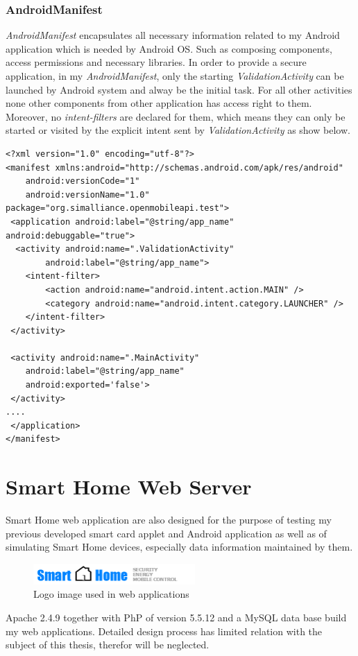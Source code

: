 \subsubsection{AndroidManifest}
\emph{AndroidManifest} encapsulates all necessary information related to my Android application which is needed by Android OS. Such as composing components, access permissions and necessary libraries\cite{android_manifest}. In order to provide a secure application, in my \emph{AndroidManifest}, only the starting \emph{ValidationActivity} can be launched by Android system and alway be the initial task. For all other activities none other components from other application has access right to them. Moreover, no \emph{intent-filters} are declared for them, which means they can only be started or visited by the explicit intent sent by \emph{ValidationActivity} as show below.
\begin{Verbatim}[fontsize=\relsize{-1},frame=lines,framesep=4mm, label=\fbox{\small\emph{AndroidManifest.xml}}]
<?xml version="1.0" encoding="utf-8"?>
<manifest xmlns:android="http://schemas.android.com/apk/res/android"
	android:versionCode="1"
	android:versionName="1.0" package="org.simalliance.openmobileapi.test">
 <application android:label="@string/app_name" android:debuggable="true">
  <activity android:name=".ValidationActivity"
 		android:label="@string/app_name">
	<intent-filter>
		<action android:name="android.intent.action.MAIN" />
		<category android:name="android.intent.category.LAUNCHER" />
	</intent-filter>
 </activity>
      
 <activity android:name=".MainActivity"
	android:label="@string/app_name"
	android:exported='false'>
 </activity>
....
 </application>
</manifest> 
\end{Verbatim}
\section{Smart Home Web Server}
Smart Home web application are also designed for the purpose of testing my previous developed smart card applet and Android application as well as of simulating Smart Home devices, especially data information maintained by them. 

\begin{figure}[!htbp]
	\centering
	\includegraphics[width=0.55\textwidth]{logo.png}
		\caption{Logo image used in web applications}
	\label{fig:logo}
\end{figure}

Apache 2.4.9 together with PhP of version 5.5.12 and a MySQL data base build my web applications.  Detailed design process has limited relation with the subject of this thesis, therefor will be neglected.